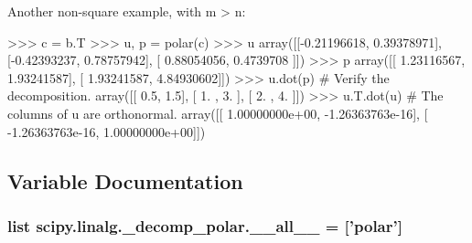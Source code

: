 \begin{DoxyVerb}
Another non-square example, with m > n:

>>> c = b.T
>>> u, p = polar(c)
>>> u
array([[-0.21196618,  0.39378971],
       [-0.42393237,  0.78757942],
       [ 0.88054056,  0.4739708 ]])
>>> p
array([[ 1.23116567,  1.93241587],
       [ 1.93241587,  4.84930602]])
>>> u.dot(p)   # Verify the decomposition.
array([[ 0.5,  1.5],
       [ 1. ,  3. ],
       [ 2. ,  4. ]])
>>> u.T.dot(u)  # The columns of u are orthonormal.
array([[  1.00000000e+00,  -1.26363763e-16],
       [ -1.26363763e-16,   1.00000000e+00]])\end{DoxyVerb}
 

\subsection{Variable Documentation}
\hypertarget{namespacescipy_1_1linalg_1_1__decomp__polar_a3d389f0a4324d5696105a5ed2123ea00}{}
\subsubsection[{\+\_\+\+\_\+all\+\_\+\+\_\+}]{\setlength{\rightskip}{0pt plus 5cm}list scipy.\+linalg.\+\_\+decomp\+\_\+polar.\+\_\+\+\_\+all\+\_\+\+\_\+ = \mbox{[}'{\bf polar}'\mbox{]}}\label{namespacescipy_1_1linalg_1_1__decomp__polar_a3d389f0a4324d5696105a5ed2123ea00}
